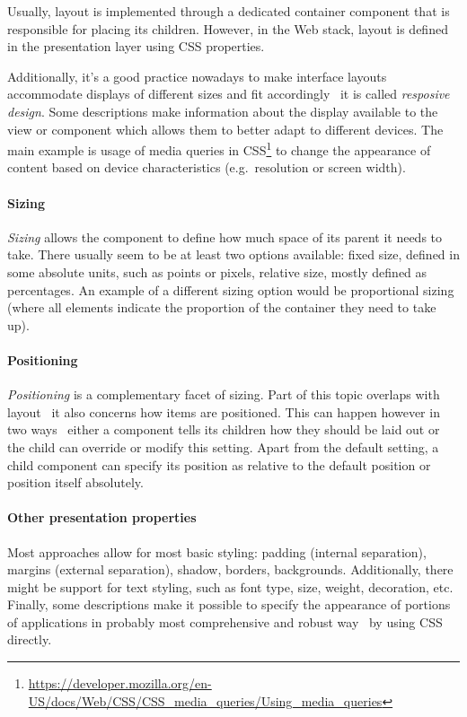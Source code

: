 Usually, layout is implemented through a dedicated container component that is responsible for placing its children.
However, in the Web stack, layout is defined in the presentation layer using CSS properties.

Additionally, it's a good practice nowadays to make interface layouts accommodate displays of different sizes and fit accordingly \textendash\ it is called \emph{resposive design}.
Some descriptions make information about the display available to the view or component which allows them to better adapt to different devices.
The main example is usage of media queries in CSS\footnote{\url{https://developer.mozilla.org/en-US/docs/Web/CSS/CSS_media_queries/Using_media_queries}} to change the appearance of content based on device characteristics (e.g.\ resolution or screen width).

\paragraph{Sizing}
\emph{Sizing} allows the component to define how much space of its parent it needs to take.
There usually seem to be at least two options available: fixed size, defined in some absolute units, such as points or pixels, relative size, mostly defined as percentages.
An example of a different sizing option would be proportional sizing (where all elements indicate the proportion of the container they need to take up).

\paragraph{Positioning}
\emph{Positioning} is a complementary facet of sizing.
Part of this topic overlaps with layout \textendash\ it also concerns how items are positioned.
This can happen however in two ways \textendash\ either a component tells its children how they should be laid out or the child can override or modify this setting.
Apart from the default setting, a child component can specify its position as relative to the default position or position itself absolutely.

\paragraph{Other presentation properties}
Most approaches allow for most basic styling: padding (internal separation), margins (external separation), shadow, borders, backgrounds.
Additionally, there might be support for text styling, such as font type, size, weight, decoration, etc.
Finally, some descriptions make it possible to specify the appearance of portions of applications in probably most comprehensive and robust way \textendash\ by using CSS directly.
